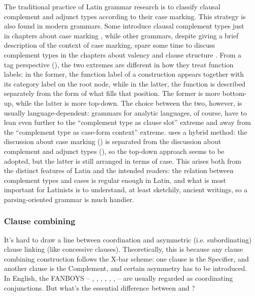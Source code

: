 {The traditional practice of Latin grammar research
is to classify clausal complement and adjunct types according to their case marking.
This strategy is also found in modern grammars.
Some introduce clausal complement types just in chapters about case marking 
\citep[]{jacques2021grammar},
while other grammars, despite giving a brief description of the context of case marking,
spare some time to discuss complement types in the chapters about valency and clause structure 
\citep[, , ]{forker2020grammar}.
From a \ac{tag} perspective (), 
the two extremes are different in how they treat function labels:
in the former, the function label of a construction appears together with its category label on the root node,
while in the latter, the function is described separately from the form of what fills that position.
The former is more bottom-up, 
while the latter is more top-down.
The choice between the two, however, is usually language-dependent:
grammars for analytic languages, of course, have to lean even further to the 
``complement type as clause slot'' extreme 
and away from the ``complement type as case-form context'' extreme.
\citet{allen1903allen} uses a hybrid method:
the discussion about case marking () is separated from 
the discussion about complement and adjunct types (),
so the top-down approach seems to be adopted,
but the latter is still arranged in terms of case.
This arises both from the distinct features of Latin and the intended readers:
the relation between complement types and cases is regular enough in Latin,
and what is most important for Latinists is to understand, at least sketchily, ancient writings, 
so a parsing-oriented grammar is much handier.

\subsubsection{Clause combining}

It's hard to draw a line between coordination and asymmetric (i.e. subordinating) clause linking 
(like concessive clauses).
Theoretically, this is because any clause combining construction follows the X-bar scheme:
one clause is the Specifier, 
and another clause is the Complement,
and certain asymmetry has to be introduced.
In English, the FANBOYS 
-- , , , , 
, ,  -- are usually regarded as coordinating conjunctions.
But what's the essential difference between  and ?

}
